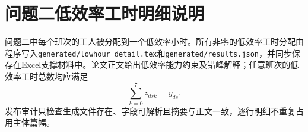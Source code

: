 \section{问题二低效率工时明细说明}

问题二中每个班次的工人被分配到一个低效率小时。所有非零的低效率工时分配由程序写入\texttt{generated/lowhour\_detail.tex}和\texttt{generated/results.json}，并同步保存在Excel支撑材料中。论文正文给出低效率能力约束及错峰解释；任意班次的低效率工时总数均应满足
\begin{equation}
\sum_{k=0}^{7}z_{dsk}=y_{ds}.
\end{equation}
发布审计只检查生成文件存在、字段可解析且摘要与正文一致，逐行明细不重复占用主体篇幅。
